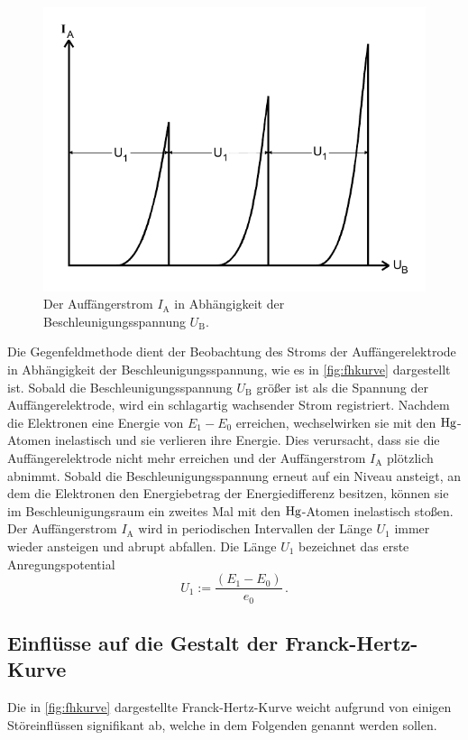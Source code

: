 \begin{figure}[H]
    \centering
    \includegraphics[width=0.6\linewidth]{pictures/frank-hertz-kurve.pdf}
    \caption{Der Auffängerstrom $I_\text{A}$ in Abhängigkeit der Beschleunigungsspannung $U_\text{B}$. \cite{v601}}
    \label{fig:fhkurve}
\end{figure}

Die Gegenfeldmethode dient der Beobachtung des Stroms der Auffängerelektrode in Abhängigkeit der Beschleunigungsspannung,
wie es in \autoref{fig:fhkurve} dargestellt ist.
Sobald die Beschleunigungsspannung $U_\text{B}$ größer ist als die Spannung der Auffängerelektrode, wird ein schlagartig wachsender Strom registriert.
Nachdem die Elektronen eine Energie von $E_1 - E_0$ erreichen, wechselwirken sie mit den $\ce{Hg}$-Atomen inelastisch und sie verlieren ihre Energie.
Dies verursacht, dass sie die Auffängerelektrode nicht mehr erreichen und der Auffängerstrom $I_\text{A}$ plötzlich abnimmt.
Sobald die Beschleunigungsspannung erneut auf ein Niveau ansteigt, an dem die Elektronen den Energiebetrag der Energiedifferenz besitzen,
können sie im Beschleunigungsraum ein zweites Mal mit den $\ce{Hg}$-Atomen inelastisch stoßen.
Der Auffängerstrom $I_\text{A}$ wird in periodischen Intervallen der Länge $U_1$ immer wieder ansteigen und abrupt abfallen. 
Die Länge $U_1$ bezeichnet das erste Anregungspotential
\begin{equation}
    U_{1}:=\frac{\left(E_{1}-E_{0}\right)}{e_{0}} \, .
\end{equation}


\subsection{Einflüsse auf die Gestalt der Franck-Hertz-Kurve}

Die in \autoref{fig:fhkurve} dargestellte Franck-Hertz-Kurve weicht aufgrund von einigen Störeinflüssen signifikant ab, 
welche in dem Folgenden genannt werden sollen.


